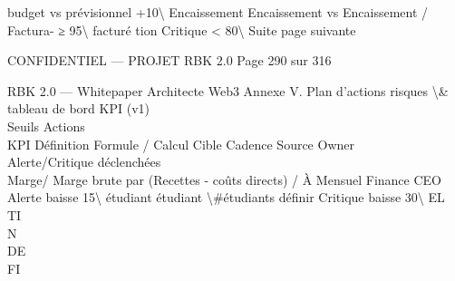 budget         vs prévisionnel                               +10\textbackslash{}%
Encaissement   Encaissement vs Encaissement / Factura-       ≥ 95\textbackslash{}%
facturé           tion                                                                   Critique \textless{} 80\textbackslash{}%
Suite page suivante\\
\vspace{0.5em}
\vspace{0.5em}
\vspace{0.5em}
\vspace{0.5em}
\begin{confidential}CONFIDENTIEL — PROJET RBK 2.0                                                 Page 290 sur 316\end{confidential}
RBK 2.0 — Whitepaper Architecte Web3                                                                      Annexe V. Plan d’actions risques \textbackslash{}& tableau de bord KPI (v1)\\
\vspace{0.5em}
\vspace{0.5em}
Seuils                Actions\\
KPI           Définition        Formule / Calcul             Cible     Cadence   Source    Owner\\
Alerte/Critique       déclenchées\\
Marge/        Marge brute par   (Recettes - coûts directs) / À         Mensuel   Finance   CEO     Alerte baisse 15\textbackslash{}%
étudiant      étudiant          \textbackslash{}#étudiants                   définir                               Critique baisse 30\textbackslash{}%
\vspace{0.5em}
\vspace{0.5em}
\vspace{0.5em}
\vspace{0.5em}
EL\\
TI\\
N\\
DE\\
FI\\
